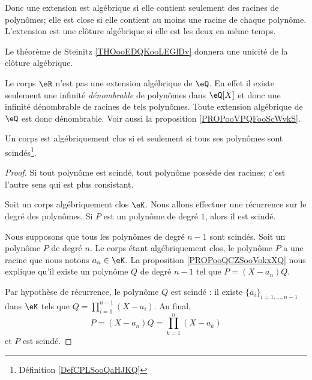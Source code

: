 \begin{normaltext}
	Donc une extension est algébrique si elle contient seulement des racines de polynômes; elle est close si elle contient au moins une racine de chaque polynôme. L'extension est une clôture algébrique si elle est les deux en même temps.
\end{normaltext}

\begin{normaltext}[Unicité]
	Le théorème de Steinitz \ref{THOooEDQKooLEGlDv} donnera une unicité de la clôture algébrique.
\end{normaltext}

\begin{example}
	Le corps \( \eR\) n'est pas une extension algébrique de \( \eQ\). En effet il existe seulement une infinité \emph{dénombrable} de polynômes dans \( \eQ[X]\) et donc une infinité dénombrable de racines de tels polynômes. Toute extension algébrique de \( \eQ\) est donc dénombrable. Voir aussi la proposition \ref{PROPooVPQFooScWvkS}.
\end{example}

\begin{lemma}       \label{LEMooEYRSooUREeDl}
	Un corps est algébriquement clos si et seulement si tous ses polynômes sont scindés\footnote{Définition \ref{DefCPLSooQaHJKQ}}.
\end{lemma}

\begin{proof}
	Si tout polynôme est scindé, tout polynôme possède des racines; c'est l'autre sens qui est plus consistant.

	Soit un corps algébriquement clos \( \eK\). Nous allons effectuer une récurrence sur le degré des polynômes. Si \( P\) est un polynôme de degré \( 1\), alors il est scindé.

	Nous supposons que tous les polynômes de degré \( n-1\) sont scindés. Soit un polynôme \( P\) de degré \( n\). Le corps étant algébriquement clos, le polynôme \( P\) a une racine que nous notons \( a_n\in \eK\). La proposition \ref{PROPooQCZSooVokxXQ} nous explique qu'il existe un polynôme \( Q\) de degré \( n-1\) tel que \( P=(X-a_n)Q\).

	Par hypothèse de récurrence, le polynôme \( Q\) est scindé : il existe \( \{ a_i \}_{i=1,\ldots, n-1}\) dans \( \eK\) tels que \( Q=\prod_{i=1}^{n-1}(X-a_i)\). Au final,
	\begin{equation}
		P=(X-a_n)Q=\prod_{k=1}^n(X-a_k)
	\end{equation}
	et \( P\) est scindé.
\end{proof}

